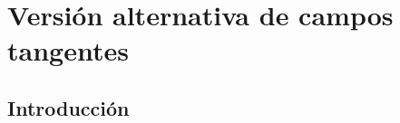 \documentclass[../VD.tex]{subfiles}
\begin{document}
\setcounter{chapter}{6}
\chapter{Versión alternativa de campos tangentes}\label{chap:campos}

\section{Introducción}
\end{document}
